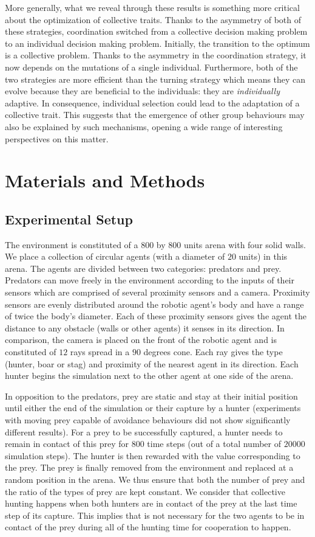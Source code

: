     More generally, what we reveal through these results is something more critical about the optimization of collective traits. Thanks to the asymmetry of both of these strategies, coordination switched from a collective decision making problem to an individual decision making problem. Initially, the transition to the optimum is a collective problem. Thanks to the asymmetry in the coordination strategy, it now depends on the mutations of a single individual. Furthermore, both of the two strategies are more efficient than the turning strategy which means they can evolve because they are beneficial to the individuals: they are \emph{individually} adaptive. In consequence, individual selection could lead to the adaptation of a collective trait. This suggests that the emergence of other group behaviours may also be explained by such mechanisms, opening a wide range of interesting perspectives on this matter.


\section{Materials and Methods}
\label{sec:matandmet}
  \subsection{Experimental Setup}
    The environment is constituted of a $800$ by $800$ units arena with four solid walls. We place a collection of circular agents (with a diameter of $20$ units) in this arena. The agents are divided between two categories: predators and prey. Predators can move freely in the environment according to the inputs of their sensors which are comprised of several proximity sensors and a camera. Proximity sensors are evenly distributed around the robotic agent's body and have a range of twice the body's diameter. Each of these proximity sensors gives the agent the distance to any obstacle (walls or other agents) it senses in its direction. In comparison, the camera is placed on the front of the robotic agent and is constituted of $12$ rays spread in a $90$ degrees cone. Each ray gives the type (hunter, boar or stag) and proximity of the nearest agent in its direction. Each hunter begins the simulation next to the other agent at one side of the arena.

    In opposition to the predators, prey are static and stay at their initial position until either the end of the simulation or their capture by a hunter (experiments with moving prey capable of avoidance behaviours did not show significantly different results). For a prey to be successfully captured, a hunter needs to remain in contact of this prey for $800$ time steps (out of a total number of $20000$ simulation steps). The hunter is then rewarded with the value corresponding to the prey. The prey is finally removed from the environment and replaced at a random position in the arena. We thus ensure that both the number of prey and the ratio of the types of prey are kept constant. We consider that collective hunting happens when both hunters are in contact of the prey at the last time step of its capture. This implies that is not necessary for the two agents to be in contact of the prey during all of the hunting time for cooperation to happen.

